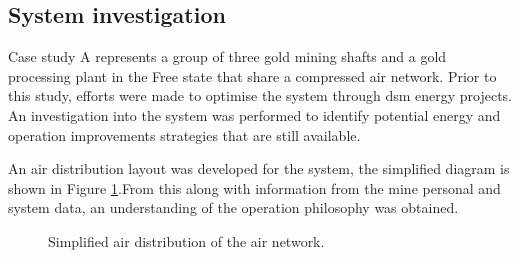 \subsection{System investigation}
Case study A represents a group of three gold mining shafts and a gold processing plant in the Free state that share a compressed air network. Prior to this study, efforts were made to optimise the system through \gls{dsm} energy projects. An investigation into the system was performed to identify potential energy and operation improvements strategies that are still available.
\par 
An air distribution layout was developed for the system, the simplified diagram is shown in Figure \ref{fig: Beatrix Air layout}.From this along with information from the mine personal and system data, an understanding of the operation philosophy was obtained. 
\par 
\begin{figure}[h!]
	\centering
	\caption{Simplified air distribution of the air network.}
	\label{fig: Beatrix Air layout}
\end{figure}


